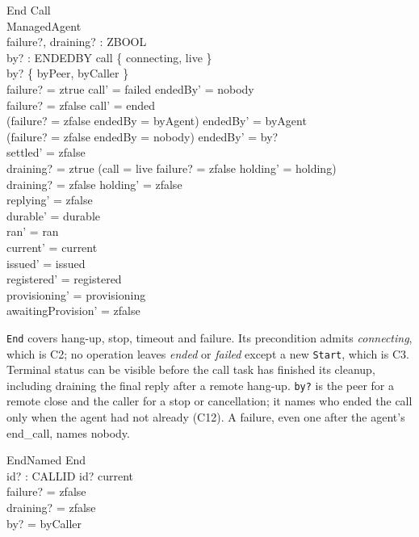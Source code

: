 \documentclass[a4paper,10pt,fleqn]{article}
\begin{document}
\begin{schema}{End}
  \Delta Call \\
  \Delta ManagedAgent \\
  failure?, draining? : ZBOOL \\
  by? : ENDEDBY
\where
  call \in \{ connecting, live \} \\
  by? \in \{ byPeer, byCaller \} \\
  failure? = ztrue \implies call' = failed \land endedBy' = nobody \\
  failure? = zfalse \implies call' = ended \\
  (failure? = zfalse \land endedBy = byAgent) \implies endedBy' = byAgent \\
  (failure? = zfalse \land endedBy = nobody) \implies endedBy' = by? \\
  settled' = zfalse \\
  draining? = ztrue \implies
    (call = live \land failure? = zfalse \land holding' = holding) \\
  draining? = zfalse \implies holding' = zfalse \\
  replying' = zfalse \\
  durable' = durable \\
  ran' = ran \\
  current' = current \\
  issued' = issued \\
  registered' = registered \\
  provisioning' = provisioning \\
  awaitingProvision' = zfalse
\end{schema}

\texttt{End} covers hang-up, stop, timeout and failure. Its precondition
admits \emph{connecting}, which is C2; no operation leaves \emph{ended} or
\emph{failed} except a new \texttt{Start}, which is C3. Terminal status
can be visible before the call task has finished its cleanup, including
draining the final reply after a remote hang-up. \texttt{by?} is the peer
for a remote close and the caller for a stop or cancellation; it names who
ended the call only when the agent had not already (C12). A failure, even
one after the agent's end\_call, names nobody.

\begin{schema}{EndNamed}
  End \\
  id? : CALLID
\where
  id? \in current \\
  failure? = zfalse \\
  draining? = zfalse \\
  by? = byCaller
\end{schema}
\end{document}
